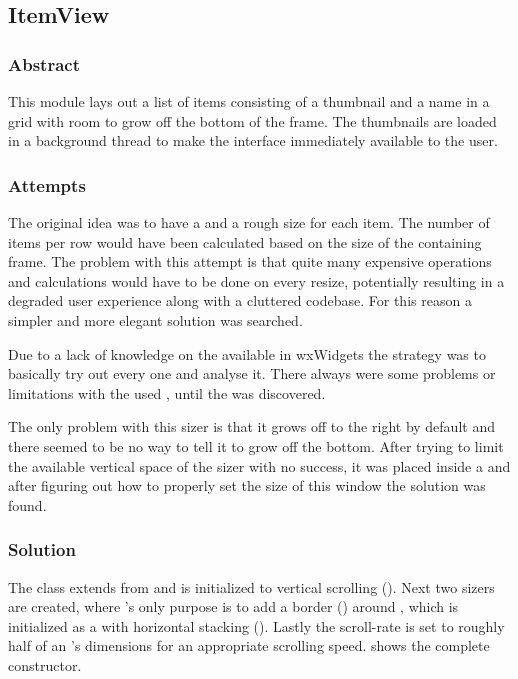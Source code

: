\subsection{ItemView}
\def\kapitelautor{Clemens Stadlbauer}

\subsubsection{Abstract}
This module lays out a list of items consisting of a thumbnail and a name in a
grid with room to grow off the bottom of the frame. The thumbnails are loaded
in a background thread to make the interface immediately available to the user.

\subsubsection{Attempts}
The original idea was to have a  and a rough size for each
item. The number of items per row would have been calculated based on the size
of the containing frame. The problem with this attempt is that quite many
expensive operations and calculations would have to be done on every resize,
potentially resulting in a degraded user experience along with a cluttered
codebase. For this reason a simpler and more elegant solution was searched.

Due to a lack of knowledge on the available  in wxWidgets the
strategy was to basically try out every one and analyse it. There always were
some problems or limitations with the used , until the
 was discovered.

The only problem with this sizer is that it grows off to the right by default
and there seemed to be no way to tell it to grow off the bottom. After trying
to limit the available vertical space of the sizer with no success, it was
placed inside a  and after figuring out how to properly
set the size of this window the solution was found.

\subsubsection{Solution} %

\begin{sloppypar}
The  class extends from  and is
initialized to vertical scrolling (). Next
two sizers are created, where 's only purpose is to add a
border () around
, which is initialized as a  with horizontal
stacking (). Lastly the scroll-rate is set
to roughly half of an 's dimensions for an appropriate scrolling
speed.  shows the complete constructor.
\end{sloppypar}

